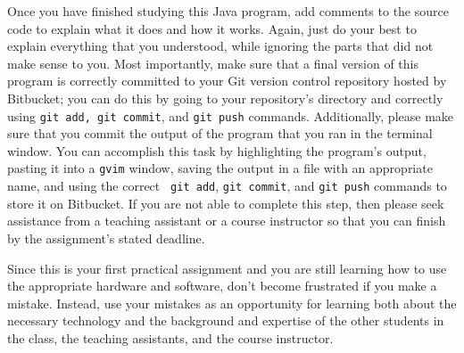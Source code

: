 Once you have finished studying this Java program, add comments to the source code to explain what it does and how it
works.  Again, just do your best to explain everything that you understood, while ignoring the parts that did not make
sense to you.  Most importantly, make sure that a final version of this program is correctly committed to your Git
version control repository hosted by Bitbucket; you can do this by going to your repository's directory and correctly
using {\tt git add, git commit}, and {\tt git push} commands. Additionally, please make sure that you commit the output
of the program that you ran in the terminal window.  You can accomplish this task by highlighting the program's output,
pasting it into a {\tt gvim} window, saving the output in a file with an appropriate name, and using the correct {\tt
git add}, {\tt git commit}, and {\tt git push} commands to store it on Bitbucket.  If you are not able to complete this
step, then please seek assistance from a teaching assistant or a course instructor so that you can finish by the
assignment's stated deadline.

Since this is your first practical assignment and you are still learning how to use the appropriate hardware and
software, don't become frustrated if you make a mistake. Instead, use your mistakes as an opportunity for learning both
about the necessary technology and the background and expertise of the other students in the class, the teaching
assistants, and the course instructor.



